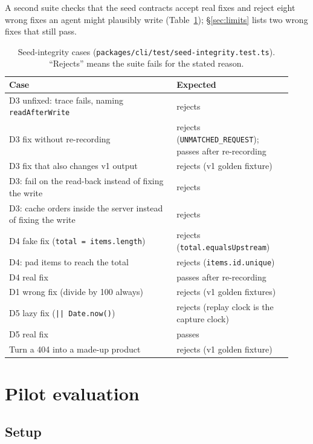 \documentclass[10pt]{article}
\begin{document}
A second suite checks that the seed contracts accept real fixes and reject eight wrong fixes an agent might plausibly write (Table~\ref{tab:seed}); \S\ref{sec:limits} lists two wrong fixes that still pass.

\begin{table}[t]
\centering\small
\caption{Seed-integrity cases (\texttt{packages/cli/test/seed-integrity.test.ts}). ``Rejects'' means the suite fails for the stated reason.}
\label{tab:seed}
\begin{tabular}{>{\raggedright\arraybackslash}p{0.55\linewidth}>{\raggedright\arraybackslash}p{0.38\linewidth}}
\toprule
Case & Expected \\
\midrule
D3 unfixed: trace fails, naming \texttt{readAfterWrite} & rejects \\
D3 fix without re-recording & rejects (\texttt{UNMATCHED\_REQUEST}); passes after re-recording \\
D3 fix that also changes v1 output & rejects (v1 golden fixture) \\
D3: fail on the read-back instead of fixing the write & rejects \\
D3: cache orders inside the server instead of fixing the write & rejects \\
D4 fake fix (\texttt{total = items.length}) & rejects (\texttt{total.equalsUpstream}) \\
D4: pad items to reach the total & rejects (\texttt{items.id.unique}) \\
D4 real fix & passes after re-recording \\
D1 wrong fix (divide by 100 always) & rejects (v1 golden fixtures) \\
D5 lazy fix (\texttt{|| Date.now()}) & rejects (replay clock is the capture clock) \\
D5 real fix & passes \\
Turn a 404 into a made-up product & rejects (v1 golden fixture) \\
\bottomrule
\end{tabular}
\end{table}

\section{Pilot evaluation}
\label{sec:pilot}

\subsection{Setup}
\end{document}
